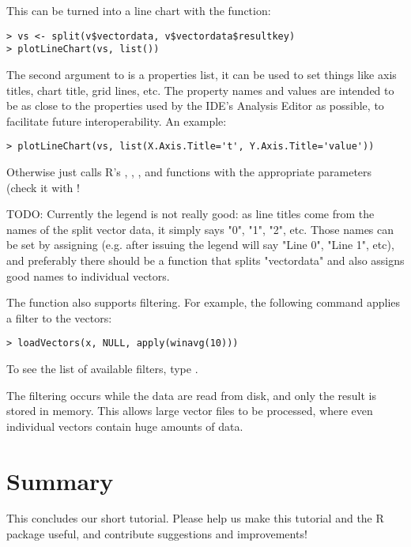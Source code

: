 This can be turned into a line chart with the  function:

\begin{verbatim}
> vs <- split(v$vectordata, v$vectordata$resultkey)
> plotLineChart(vs, list())
\end{verbatim}

The second argument to  is a properties list, it can be used
to set things like axis titles, chart title, grid lines, etc. The property names and 
values are intended to be as close to the properties used by the IDE's Analysis Editor 
as possible, to facilitate future interoperability. An example:

\begin{verbatim}
> plotLineChart(vs, list(X.Axis.Title='t', Y.Axis.Title='value'))
\end{verbatim}

Otherwise  just calls R's , , 
,  and  functions with the appropriate parameters
(check it with !

TODO: Currently the legend is not really good: as line titles come from the names of
the split vector data, it simply says "0", "1", "2", etc. Those names can be set 
by assigning  (e.g. after issuing 
the legend will say "Line 0", "Line 1", etc), and preferably there should be a function
that splits "vectordata" and also assigns good names to individual vectors.

The  function also supports filtering. For example, the following
command applies a  filter to the vectors:

\begin{verbatim}
> loadVectors(x, NULL, apply(winavg(10)))
\end{verbatim}

To see the list of available filters, type .

The filtering occurs while the data are read from disk, and only the result is 
stored in memory. This allows large vector files to be processed, where even individual 
vectors contain huge amounts of data.


\section{Summary}

This concludes our short tutorial. Please help us make this tutorial and the R package useful,
and contribute suggestions and improvements!



